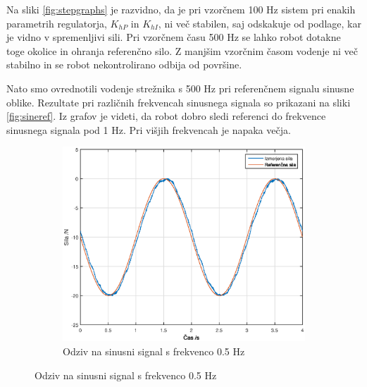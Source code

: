 \documentclass[a4paper]{article}
\begin{document}
Na sliki \ref{fig:stepgraphs} je razvidno, da je pri vzorčnem 100 Hz sistem pri enakih parametrih regulatorja, $K_{hP}$ in $K_{hI}$, ni več stabilen, saj odskakuje od podlage, kar je vidno v spremenljivi sili. Pri vzorčnem času 500 Hz se lahko robot dotakne toge okolice in ohranja referenčno silo. Z manjšim vzorčnim časom vodenje ni več stabilno in se robot nekontrolirano odbija od površine.

Nato smo ovrednotili vodenje strežnika s 500 Hz pri referenčnem signalu sinusne oblike. Rezultate pri različnih frekvencah sinusnega signala so prikazani na sliki \ref{fig:sineref}. Iz grafov je videti, da robot dobro sledi referenci do frekvence sinusnega signala pod 1 Hz. Pri višjih frekvencah je napaka večja. 

\begin{figure}[!ht]
	
\centering

	\begin{subfigure}[b]{0.4\textwidth}
		\includegraphics[width=\textwidth]{./slike/figure_5_hz.eps}
		\caption{Odziv na sinusni signal s frekvenco 0.5 Hz}
	\end{subfigure}


\end{figure}
\end{document}
